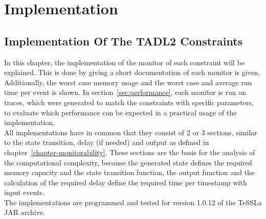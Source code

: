 
\chapter{Implementation}
\label{chapter-implementation}
	\section{Implementation Of The TADL2 Constraints}
	In this chapter, the implementation of the monitor of each constraint will be explained. This is done by giving a short documentation of each monitor is given. Additionally, the worst case memory usage and the worst case and average run time per event is shown. In section~\ref{sec:performance}, each monitor is run on traces, which were generated to match the constraints with specific parameters, to evaluate which performance can be expected in a practical usage of the implementation.\\
	All implementations have in common that they consist of 2 or 3 sections, similar to the state transition, delay (if needed) and output as defined in chapter~\ref{chapter-monitorability}. These sections are the basis for the analysis of the computational complexity, because the generated state defines the required memory capacity and the state transition function, the output function and the calculation of the required delay define the required time per timestamp with input events.\\
	The implementations are programmed and tested for version 1.0.12 of the TeSSLa JAR archive.
	 
